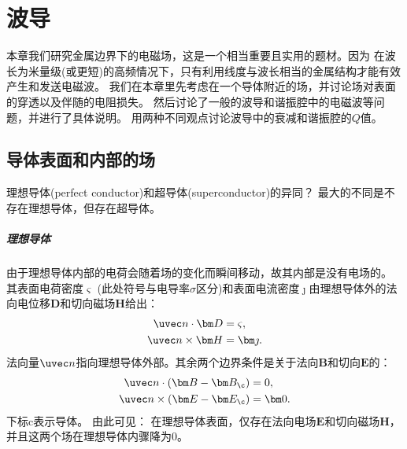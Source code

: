 \chapter{波导}
\label{chap:waveguide}
本章我们研究金属边界下的电磁场，这是一个相当重要且实用的题材。因为
在波长为米量级(或更短)的高频情况下，只有利用线度与波长相当的金属结构才能有效产生和发送电磁波。
我们在本章里先考虑在一个导体附近的场，并讨论场对表面的穿透以及伴随的电阻损失。
然后讨论了一般的波导和谐振腔中的电磁波等问题，并进行了具体说明。
用两种不同观点讨论波导中的衰减和谐振腔的$Q$值。

\section{导体表面和内部的场}
理想导体(perfect conductor)和超导体(superconductor)的异同？
最大的不同是不存在理想导体，但存在超导体。

\paragraph{理想导体}


由于理想导体内部的电荷会随着场的变化而瞬间移动，故其内部是没有电场的。
其表面电荷密度$\varsigma$ (此处符号与电导率$\sigma$区分)和表面电流密度$\bm\jmath$由理想导体外的法向电位移$\bm D$和切向磁场$\bm H$给出：
\begin{subequations}
    \begin{align}
        \uvec n\cdot\bm D&=\varsigma,\\
        \label{eqn:nxH=j}
        \uvec n\times\bm H&=\bm\jmath.
    \end{align}
\end{subequations}
法向量$\uvec n$指向理想导体外部。其余两个边界条件是关于法向$\bm B$和切向$\bm E$的：
\begin{subequations}
    \begin{align}
        \uvec n\cdot(\bm B-\bm B_\c)&=0,\\
        \uvec n\times(\bm E-\bm E_\c)&=\bm 0.
    \end{align}
\end{subequations}
下标c表示导体。
由此可见：
在理想导体表面，仅存在法向电场$\bm E$和切向磁场$\bm H$，并且这两个场在理想导体内骤降为0。

